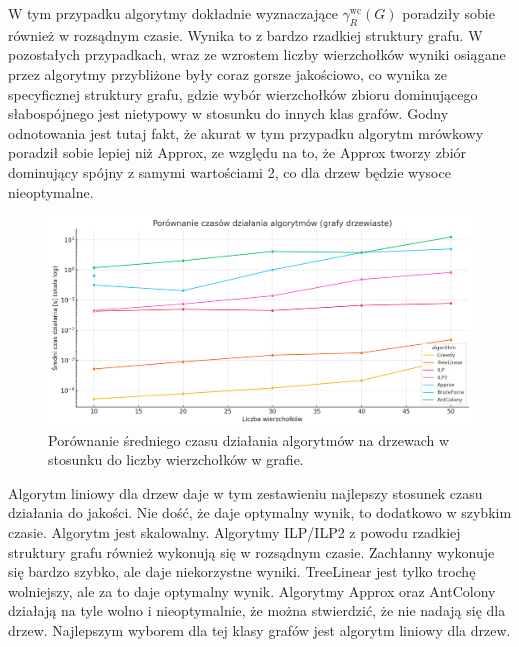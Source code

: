     W tym przypadku algorytmy dokładnie wyznaczające $\gamma^{\text{wc}}_R(G)$ poradziły sobie również w rozsądnym czasie. Wynika to z bardzo rzadkiej struktury grafu. W pozostałych przypadkach, wraz ze wzrostem liczby wierzchołków wyniki osiągane przez algorytmy przybliżone były coraz gorsze jakościowo, co wynika ze specyficznej struktury grafu, gdzie wybór wierzchołków zbioru dominującego słabospójnego jest nietypowy w stosunku do innych klas grafów. Godny odnotowania jest tutaj fakt, że akurat w tym przypadku algorytm mrówkowy poradził sobie lepiej niż Approx, ze względu na to, że Approx tworzy zbiór dominujący spójny z samymi wartościami 2, co dla drzew będzie wysoce nieoptymalne.

    \begin{figure}[H]
        \centering
        \includegraphics[width=\textwidth]{assets/trees.png}
        \caption{Porównanie średniego czasu działania algorytmów na drzewach w stosunku do liczby wierzchołków w grafie.}
        \label{fig:treePlot}
    \end{figure}

    Algorytm liniowy dla drzew daje w tym zestawieniu najlepszy stosunek czasu działania do jakości. Nie dość, że daje optymalny wynik, to dodatkowo w szybkim czasie. Algorytm jest skalowalny. Algorytmy ILP/ILP2 z powodu rzadkiej struktury grafu również wykonują się w rozsądnym czasie. Zachłanny wykonuje się bardzo szybko, ale daje niekorzystne wyniki. TreeLinear jest tylko trochę wolniejszy, ale za to daje optymalny wynik. Algorytmy Approx oraz AntColony działają na tyle wolno i nieoptymalnie, że można stwierdzić, że nie nadają się dla drzew. Najlepszym wyborem dla tej klasy grafów jest algorytm liniowy dla drzew.

